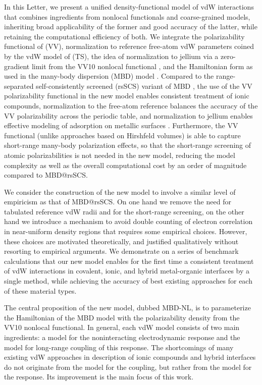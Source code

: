 In this Letter, we present a unified density-functional model of vdW interactions that combines ingredients from nonlocal functionals and coarse-grained models, inheriting broad applicability of the former and good accuracy of the latter, while retaining the computational efficiency of both.
We integrate the polarizability functional of \citet{VydrovPRA10} (VV), normalization to reference free-atom vdW parameters coined by the vdW model of \citet{TkatchenkoPRL09} (TS), the idea of normalization to jellium via a zero-gradient limit from the VV10 nonlocal functional \citep{VydrovJCP10a}, and the Hamiltonian form as used in the many-body dispersion (MBD) model \citep{TkatchenkoJCP13}.
Compared to the range-separated self-consistently screened (rsSCS) variant of MBD \citep{AmbrosettiJCP14}, the use of the VV polarizability functional in the new model enables consistent treatment of ionic compounds, normalization to the free-atom reference balances the accuracy of the VV polarizability across the periodic table, and normalization to jellium enables effective modeling of adsorption on metallic surfaces \citep{RuizPRL12}.
Furthermore, the VV functional (unlike approaches based on Hirshfeld volumes) is able to capture short-range many-body polarization effects, so that the short-range screening of atomic polarizabilities is not needed in the new model, reducing the model complexity as well as the overall computational cost by an order of magnitude compared to MBD@rsSCS\@.

We consider the construction of the new model to involve a similar level of empiricism as that of MBD@rsSCS\@.
On one hand we remove the need for tabulated reference vdW radii and for the short-range screening, on the other hand we introduce a mechanism to avoid double counting of electron correlation in near-uniform density regions that requires some empirical choices.
However, these choices are motivated theoretically, and justified qualitatively without resorting to empirical arguments.
We demonstrate on a series of benchmark calculations that our new model enables for the first time a consistent treatment of vdW interactions in covalent, ionic, and hybrid metal-organic interfaces by a single method, while achieving the accuracy of best existing approaches for each of these material types.



The central proposition of the new model, dubbed MBD-NL, is to parameterize the Hamiltonian of the MBD model with the polarizability density from the VV10 nonlocal functional.
In general, each vdW model consists of two main ingredients: a model for the noninteracting electrodynamic response and the model for long-range coupling of this response.
The shortcomings of many existing vdW approaches in description of ionic compounds and hybrid interfaces do not originate from the model for the coupling, but rather from the model for the response.
Its improvement is the main focus of this work.

